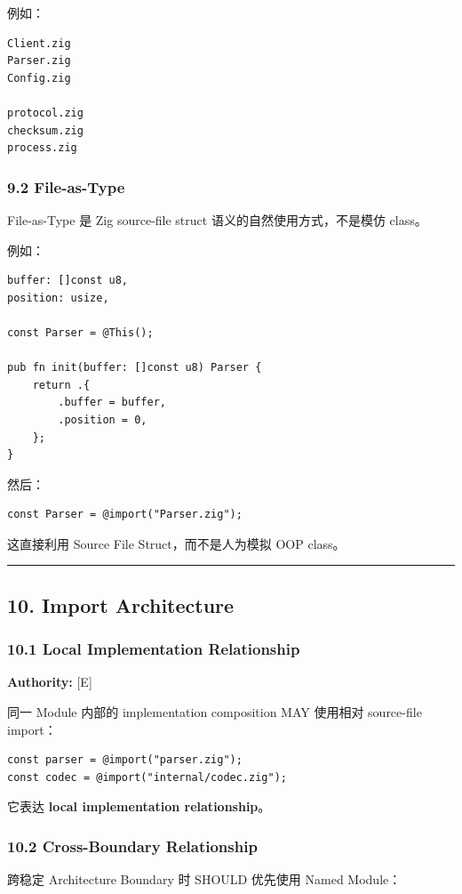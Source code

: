 \documentclass[11pt,a4paper]{article}
\begin{document}
例如：

\begin{lstlisting}[language=text]
Client.zig
Parser.zig
Config.zig

protocol.zig
checksum.zig
process.zig
\end{lstlisting}
\subsubsection{9.2 File-as-Type}
File-as-Type 是 Zig source-file struct 语义的自然使用方式，不是模仿 class。

例如：

\begin{lstlisting}[language=zig]
buffer: []const u8,
position: usize,

const Parser = @This();

pub fn init(buffer: []const u8) Parser {
    return .{
        .buffer = buffer,
        .position = 0,
    };
}
\end{lstlisting}
然后：

\begin{lstlisting}[language=zig]
const Parser = @import("Parser.zig");
\end{lstlisting}
这直接利用 Source File Struct，而不是人为模拟 OOP class。

\vspace{0.5em}\hrule\vspace{0.5em}
\subsection{10. Import Architecture}
\subsubsection{10.1 Local Implementation Relationship}
\textbf{Authority:} [E]

同一 Module 内部的 implementation composition MAY 使用相对 source-file import：

\begin{lstlisting}[language=zig]
const parser = @import("parser.zig");
const codec = @import("internal/codec.zig");
\end{lstlisting}
它表达 \textbf{local implementation relationship}。

\subsubsection{10.2 Cross-Boundary Relationship}
跨稳定 Architecture Boundary 时 SHOULD 优先使用 Named Module：
\end{document}
